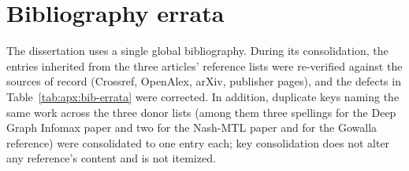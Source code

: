\section{Bibliography errata}
\label{apx:errata:bib}

The dissertation uses a single global bibliography. During its consolidation, the
entries inherited from the three articles' reference lists were re-verified against
the sources of record (Crossref, OpenAlex, arXiv, publisher pages), and the defects in
Table~\ref{tab:apx:bib-errata} were corrected. In addition, duplicate keys naming the
same work across the three donor lists (among them three spellings for the Deep Graph
Infomax paper and two for the Nash-MTL paper and for the Gowalla reference) were
consolidated to one entry each; key consolidation does not alter any reference's
content and is not itemized.



